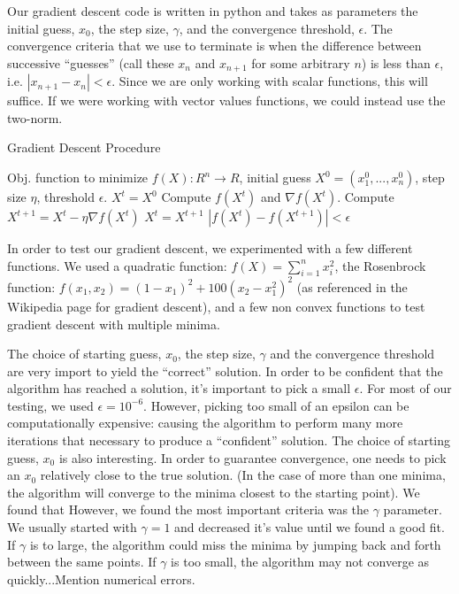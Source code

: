\documentclass{article}
\begin{document}
Our gradient descent code is written in python and takes as parameters the initial guess, $x_0$, the step size, $\gamma$, and the convergence threshold, $\epsilon$.  The convergence criteria that we use to terminate is when the difference between successive ``guesses'' (call these $x_n$ and $x_{n+1}$ for some arbitrary $n$) is less than $\epsilon$, i.e. $|x_{n+1} -x_n | < \epsilon$.  Since we are only working with scalar functions, this will suffice.  If we were working with vector values functions, we could instead use the two-norm.  

\begin{algorithm}[tb]
   \caption{Gradient Descent Procedure}
   \label{alg:GradDesc}
\begin{algorithmic}
   \STATE Obj. function to minimize $f(X):R^n \rightarrow R$, 
   \STATE initial guess  $X^0=(x^0_1,...,x^0_n)$, 
   \STATE step size $\eta$, 
   \STATE threshold $\epsilon$.
    $X^t=X^0$
   \REPEAT
   \STATE Compute  $f(X^t)$ and $\nabla f(X^t)$.
   \STATE Compute $X^{t+1}=X^t-\eta \nabla f(X^t)$
   \STATE $X^t=X^{t+1}$
   \UNTIL $\left| f(X^{t})-f(X^{t+1})\right|<\epsilon$
\end{algorithmic}
\end{algorithm}

In order to test our gradient descent, we experimented with a few different functions.  We used a quadratic function: $f(X) = \sum_{i=1}^n x_i^2$, the Rosenbrock function: $f(x_1,x_2) = (1-x_1)^2+100(x_2-x_1^2)^2$ (as referenced in the Wikipedia page for gradient descent), and a few non convex functions to test gradient descent with multiple minima.  

The choice of starting guess, $x_0$, the step size, $\gamma$ and the convergence threshold are very import to yield the ``correct'' solution.  In order to be confident that the algorithm has reached a solution, it's important to pick a small $\epsilon$.  For most of our testing, we used $\epsilon = 10^{-6}$.  However, picking too small of an epsilon can be computationally expensive: causing the algorithm to perform many more iterations that necessary to produce a ``confident'' solution.  The choice of starting guess, $x_0$ is also interesting.  In order to guarantee convergence, one needs to pick an $x_0$ relatively close to the true solution.  (In the case of more than one minima, the algorithm will converge to the minima closest to the starting point).  We found that However, we found the most important criteria was the $\gamma$ parameter.  We usually started with $\gamma=1$ and decreased it's value until we found a good fit.  If $\gamma$ is to large, the algorithm could miss the minima by jumping back and forth between the same points.  If $\gamma$ is too small, the algorithm may not converge as quickly...Mention numerical errors.  
\end{document}
